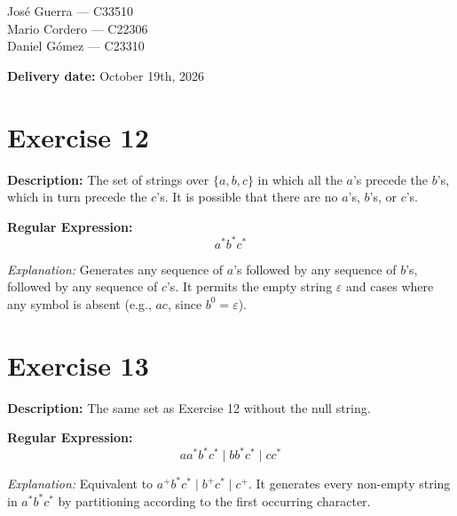 \documentclass[12pt]{article}
\newcommand{\exercisedescription}[1]{%
    \Needspace{4\baselineskip}%
    \noindent\textbf{Description:} #1\par
    \vspace{0.25cm}
}
\newcommand{\reexpression}[1]{%
    \noindent\textbf{Regular Expression:}
    \vspace{-0.25cm}
    \begin{equation*}
        #1
    \end{equation*}
    \vspace{-0.15cm}
}
\newcommand{\reexplanation}[1]{%
    \noindent\textit{Explanation:} #1\par
    \vspace{0.55cm}
}
\begin{document}
\begin{titlepage}
\begin{minipage}[t]{0.45\textwidth}
        José Guerra --- C33510\\
        Mario Cordero --- C22306\\
        Daniel Gómez --- C23310

    \end{minipage}


    \vfill

    {\large
        \textbf{Delivery date:} October 19th, 2026
    \par}

    \vspace{1.5cm}

\end{titlepage}


\section*{Exercise 12}
\exercisedescription{%
    The set of strings over $\{a,b,c\}$ in which all the $a$'s precede the $b$'s, which in turn precede the $c$'s. It is possible that there are no $a$'s, $b$'s, or $c$'s.
}
\reexpression{%
    a^* b^* c^*
}
\reexplanation{%
    Generates any sequence of $a$'s followed by any sequence of $b$'s, followed by any sequence of $c$'s. It permits the empty string $\varepsilon$ and cases where any symbol is absent (e.g., $ac$, since $b^0 = \varepsilon$).
}


\section*{Exercise 13}
\exercisedescription{%
    The same set as Exercise 12 without the null string.
}
\reexpression{%
    a a^* b^* c^* \mid b b^* c^* \mid c c^*
}
\reexplanation{%
    Equivalent to $a^+ b^* c^* \mid b^+ c^* \mid c^+$. It generates every non-empty string in $a^* b^* c^*$ by partitioning according to the first occurring character.
}

\end{document}
